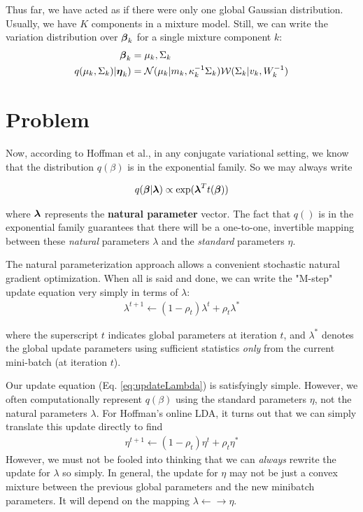\documentclass{article}
\newcommand{\BF}[1]{\mbox{\boldmath$#1$}}
\begin{document}
Thus far, we have acted as if there were only one global Gaussian distribution.  Usually, we have $K$ components in a mixture model.  Still, we can write the variation distribution over $\BF{\beta}_k$ for a single mixture component $k$:
\begin{align}
\BF{\beta}_k &= \mu_k, \Sigma_k \\
q( \mu_k, \Sigma_k) | \BF{\eta}_k ) &= \mathcal{N}( \mu_k | m_k,  \kappa_k^{-1} \Sigma_k )  \mathcal{W}( \Sigma_k | v_k, W_k^{-1} )
\end{align}

\section{Problem}
Now, according to Hoffman et al., in any conjugate variational setting, we know that the distribution $q(\beta)$ is in the exponential family.  So we may always write

\begin{align}
q(\BF{\beta} | \BF{\lambda} ) \propto \exp( \BF{\lambda}^T t(\BF{\beta}) )
\end{align}

where $\BF{\lambda}$ represents the \textbf{natural parameter} vector.  The fact that $q()$ is in the exponential family guarantees that there will be a one-to-one, invertible mapping between these  \emph{natural} parameters $\lambda$ and the \emph{standard} parameters $\eta$.

The natural parameterization approach allows a convenient stochastic natural gradient optimization.  When all is said and done, we can write the "M-step" update equation very simply in terms of $\lambda$:
\begin{align}\label{eq:updateLambda}
\lambda^{t+1} \gets (1-\rho_t) \lambda^{t} + \rho_t \lambda^*
\end{align}

where the superscript $t$ indicates global parameters at iteration $t$, and $\lambda^*$ denotes the global update parameters using sufficient statistics \emph{only} from the current mini-batch (at iteration $t$). 

Our update equation (Eq. \ref{eq:updateLambda}) is satisfyingly simple.  However, we often computationally represent  $q(\beta)$ using the standard parameters $\eta$, not the natural parameters $\lambda$.  For Hoffman's online LDA, it turns out that we can simply translate this update directly to find
\begin{align}\label{eq:updateEta}
\eta^{t+1} \gets (1-\rho_t) \eta^{t} + \rho_t \eta^*
\end{align}
However, we must not be fooled into thinking that we can \emph{always} rewrite the update for $\lambda$ so simply.  In general, the update for $\eta$ may not be just a convex mixture between the previous global parameters and the new minibatch parameters.  It will depend on the mapping $\lambda \leftarrow \rightarrow \eta$. 
\end{document}
